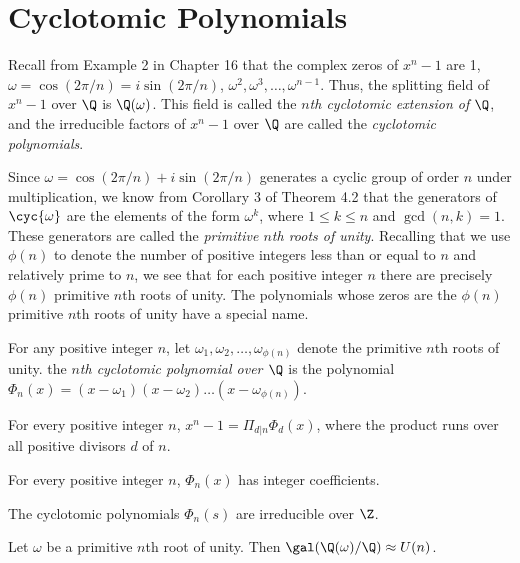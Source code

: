 \section{Cyclotomic Polynomials}

\begin{remark}
	Recall from Example 2 in Chapter 16 that the complex zeros of $x^n-1$ are 1, $\omega = \cos(2\pi/n) = i\sin(2\pi/n)$, $\omega^2, \omega^3,\dots,\omega^{n-1}$. Thus, the splitting field of $x^n-1$ over $\Q$ is $\Q(\omega)$. This field is called the \textit{$n$th cyclotomic extension of $\Q$}, and the irreducible factors of $x^n-1$ over $\Q$ are called the \textit{cyclotomic polynomials}.

	Since $\omega=\cos(2\pi/n) + i\sin(2\pi/n)$ generates a cyclic group of order $n$ under multiplication, we know from Corollary 3 of Theorem 4.2 that the generators of $\cyc{\omega}$ are the elements of the form $\omega^k$, where $1 \leq k \leq n$ and $\gcd(n,k) = 1$. These generators are called the \textit{primitive $n$th roots of unity}. Recalling that we use $\phi(n)$ to denote the number of positive integers less than or equal to $n$ and relatively prime to $n$, we see that for each positive integer $n$ there are precisely $\phi(n)$ primitive $n$th roots of unity. The polynomials whose zeros are the $\phi(n)$ primitive $n$th roots of unity have a special name.
\end{remark}

\begin{definition}
	For any positive integer $n$, let $\omega_1,\omega_2,\dots,\omega_{\phi(n)}$ denote the primitive $n$th roots of unity. the \textit{$n$th cyclotomic polynomial over $\Q$} is the polynomial $\Phi_n(x) = (x-\omega_1)(x-\omega_2)\dots(x-\omega_{\phi(n)})$.
\end{definition}

\begin{theorem}
	For every positive integer $n$, $x^n-1 = \Pi_{d\vert n}\Phi_d(x)$, where the product runs over all positive divisors $d$ of $n$.
\end{theorem}

\begin{theorem}
	For every positive integer $n$, $\Phi_n(x)$ has integer coefficients.
\end{theorem}

\begin{theorem}[(Gauss)]
	The cyclotomic polynomials $\Phi_n(s)$ are irreducible over $\Z$.
\end{theorem}

\begin{theorem}
	Let $\omega$ be a primitive $n$th root of unity. Then $\gal(\Q(\omega)/\Q) \approx U(n)$.
\end{theorem}
